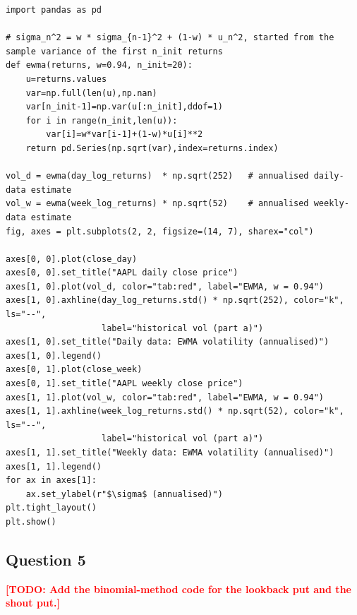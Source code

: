 \documentclass[11pt,a4paper]{article}
\newcommand{\todo}[1]{\textcolor{red}{\textbf{[TODO: #1]}}}
\begin{document}
\begin{lstlisting}[caption={Q4b: EWMA volatility estimates ($w=0.94$, first 20 observations for $\sigma^*$).}, label={lst:q4b}]
import pandas as pd

# sigma_n^2 = w * sigma_{n-1}^2 + (1-w) * u_n^2, started from the sample variance of the first n_init returns
def ewma(returns, w=0.94, n_init=20):
    u=returns.values
    var=np.full(len(u),np.nan)
    var[n_init-1]=np.var(u[:n_init],ddof=1)
    for i in range(n_init,len(u)):
        var[i]=w*var[i-1]+(1-w)*u[i]**2
    return pd.Series(np.sqrt(var),index=returns.index)

vol_d = ewma(day_log_returns)  * np.sqrt(252)   # annualised daily-data estimate
vol_w = ewma(week_log_returns) * np.sqrt(52)    # annualised weekly-data estimate
fig, axes = plt.subplots(2, 2, figsize=(14, 7), sharex="col")

axes[0, 0].plot(close_day)
axes[0, 0].set_title("AAPL daily close price")
axes[1, 0].plot(vol_d, color="tab:red", label="EWMA, w = 0.94")
axes[1, 0].axhline(day_log_returns.std() * np.sqrt(252), color="k", ls="--",
                   label="historical vol (part a)")
axes[1, 0].set_title("Daily data: EWMA volatility (annualised)")
axes[1, 0].legend()
axes[0, 1].plot(close_week)
axes[0, 1].set_title("AAPL weekly close price")
axes[1, 1].plot(vol_w, color="tab:red", label="EWMA, w = 0.94")
axes[1, 1].axhline(week_log_returns.std() * np.sqrt(52), color="k", ls="--",
                   label="historical vol (part a)")
axes[1, 1].set_title("Weekly data: EWMA volatility (annualised)")
axes[1, 1].legend()
for ax in axes[1]:
    ax.set_ylabel(r"$\sigma$ (annualised)")
plt.tight_layout()
plt.show()
\end{lstlisting}

\subsection{Question 5}

\todo{Add the binomial-method code for the lookback put and the shout put.}
\end{document}
